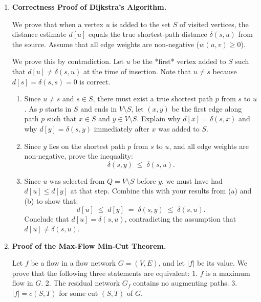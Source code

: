 \documentclass[12pt, a4paper]{book}
\begin{document}
\begin{deepbox}
\begin{enumerate}[label=\textbf{D\arabic*.}]
  \item \textbf{Correctness Proof of Dijkstra's Algorithm.}
  
        We prove that when a vertex $u$ is added to the set $S$ of visited vertices, the distance estimate $d[u]$ equals the true shortest-path distance $\delta(s, u)$ from the source.
        Assume that all edge weights are non-negative ($w(u, v) \ge 0$).
        
        We prove this by contradiction. Let $u$ be the *first* vertex added to $S$ such that $d[u] \neq \delta(s, u)$ at the time of insertion. Note that $u \neq s$ because $d[s] = \delta(s, s) = 0$ is correct.
        
        \begin{enumerate}[label=(\alph*)]
          \item Since $u \neq s$ and $s \in S$, there must exist a true shortest path $p$ from $s$ to $u$.
                As $p$ starts in $S$ and ends in $V \setminus S$, let $(x, y)$ be the first edge along path $p$ such that $x \in S$ and $y \in V \setminus S$.
                Explain why $d[x] = \delta(s, x)$ and why $d[y] = \delta(s, y)$ immediately after $x$ was added to $S$.
          \item Since $y$ lies on the shortest path $p$ from $s$ to $u$, and all edge weights are non-negative, prove the inequality:
                \[
                  \delta(s, y) \;\le\; \delta(s, u).
                \]
          \item Since $u$ was selected from $Q = V \setminus S$ before $y$, we must have had $d[u] \le d[y]$ at that step.
                Combine this with your results from (a) and (b) to show that:
                \[
                  d[u] \;\le\; d[y] \;=\; \delta(s, y) \;\le\; \delta(s, u).
                \]
                Conclude that $d[u] = \delta(s, u)$, contradicting the assumption that $d[u] \neq \delta(s, u)$.
        \end{enumerate}

  \item \textbf{Proof of the Max-Flow Min-Cut Theorem.}
  
        Let $f$ be a flow in a flow network $G = (V, E)$, and let $|f|$ be its value.
        We prove that the following three statements are equivalent:
        1. $f$ is a maximum flow in $G$.
        2. The residual network $G_f$ contains no augmenting paths.
        3. $|f| = c(S, T)$ for some cut $(S, T)$ of $G$.
        

\end{enumerate}
\end{deepbox}
\end{document}
